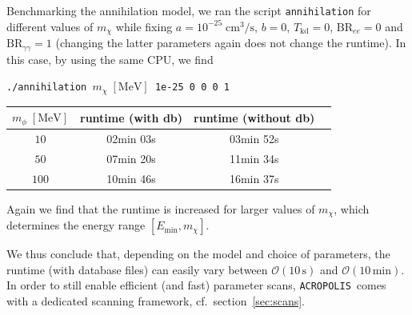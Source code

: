 \documentclass[11pt,a4paper]{article}
\newcommand{\acropolis}{\texttt{ACROPOLIS}~}
\begin{document}
Benchmarking the annihilation model, we ran the script \texttt{annihilation} for different values of $m_\chi$ while fixing $a=10^{-25}\;\mathrm{cm^3/s}$, $b=0$, $T_\text{kd} = 0$, $\text{BR}_{ee} = 0$ and $\text{BR}_{\gamma\gamma}=1$ (changing the latter parameters again does not change the runtime). In this case, by using the same CPU, we find
\begin{center}
	\texttt{./annihilation $m_\chi\;\mathrm{[MeV]}$ 1e-25 0 0 0 1}
	\begin{tabular}{|c|c|c|c|}
		\hline
		$m_\phi\;\mathrm{[MeV]}$ &  runtime (with db) & runtime (without db) \\
		\hline\hline
		$10$ & 02min 03s & 03min 52s\\
		\hline
		$50$ & 07min 20s & 11min 34s \\
		\hline
		$100$ & 10min 46s & 16min 37s \\
		\hline
	\end{tabular}
\end{center}
Again we find that the runtime is increased for larger values of $m_\chi$, which determines the energy range $[E_\text{min}, m_\chi]$.

We thus conclude that, depending on the model and choice of parameters, the runtime (with database files) can easily vary between $\mathcal{O}(10\,\mathrm{s})$ and $\mathcal{O}(10\,\mathrm{min})$. In order to still enable efficient (and fast) parameter scans, \acropolis comes with a dedicated scanning framework, cf.\ section~\ref{sec:scans}.



\end{document}
